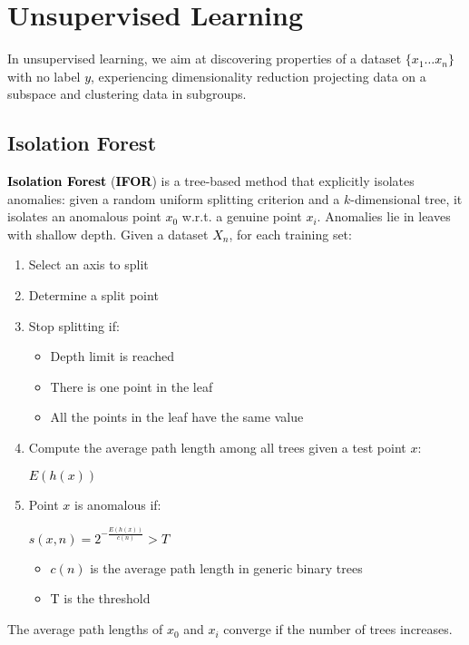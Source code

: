 \documentclass{article}
\newcommand{\bb}[1]{\textcolor{black}{\textbf{#1}}}
\newcommand{\rr}[1]{\textcolor{black}{#1}}
\newcommand{\cc}[1]{\begin{center}\textcolor{black}{#1}\end{center}}
\begin{document}
\newpage

\section{Unsupervised Learning}
In unsupervised learning, we aim at discovering properties of a dataset \rr{$\{x_1\dots x_n\}$} with no label \rr{$y$}, experiencing dimensionality reduction projecting data on a subspace and clustering data in subgroups.

\subsection{Isolation Forest}
\bb{Isolation Forest} (\bb{IFOR}) is a tree-based method that explicitly isolates anomalies: given a random uniform splitting criterion and a $k$-dimensional tree, it isolates an anomalous point \rr{$x_0$} w.r.t. a genuine point \rr{$x_i$}. Anomalies lie in leaves with shallow depth. Given a dataset \rr{$X_n$}, for each training set:
\begin{enumerate}
    \item Select an axis to split
    \item Determine a split point
    \item Stop splitting if:
        \begin{itemize}
            \item Depth limit is reached
            \item There is one point in the leaf
            \item All the points in the leaf have the same value
        \end{itemize}
    \item Compute the average path length among all trees given a test point \rr{$x$}:
        \cc{$E(h(x))$}
    \item Point \rr{$x$} is anomalous if:
        \cc{$s(x,n)= 2^{-\frac{E(h(x))}{c(n)}}>T$}
        \begin{itemize}
            \item \rr{$c(n)$} is the average path length in generic binary trees
            \item \rr{T} is the threshold
        \end{itemize}
\end{enumerate}
The average path lengths of \rr{$x_0$} and \rr{$x_i$} converge if the number of trees increases.
\newpage
\end{document}
